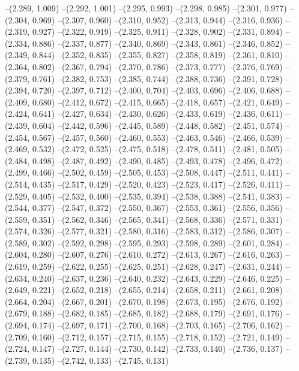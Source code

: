 {--(2.289, 1.009)
--(2.292, 1.001)
--(2.295, 0.993)
--(2.298, 0.985)
--(2.301, 0.977)
--(2.304, 0.969)
--(2.307, 0.960)
--(2.310, 0.952)
--(2.313, 0.944)
--(2.316, 0.936)
--(2.319, 0.927)
--(2.322, 0.919)
--(2.325, 0.911)
--(2.328, 0.902)
--(2.331, 0.894)
--(2.334, 0.886)
--(2.337, 0.877)
--(2.340, 0.869)
--(2.343, 0.861)
--(2.346, 0.852)
--(2.349, 0.844)
--(2.352, 0.835)
--(2.355, 0.827)
--(2.358, 0.819)
--(2.361, 0.810)
--(2.364, 0.802)
--(2.367, 0.794)
--(2.370, 0.786)
--(2.373, 0.777)
--(2.376, 0.769)
--(2.379, 0.761)
--(2.382, 0.753)
--(2.385, 0.744)
--(2.388, 0.736)
--(2.391, 0.728)
--(2.394, 0.720)
--(2.397, 0.712)
--(2.400, 0.704)
--(2.403, 0.696)
--(2.406, 0.688)
--(2.409, 0.680)
--(2.412, 0.672)
--(2.415, 0.665)
--(2.418, 0.657)
--(2.421, 0.649)
--(2.424, 0.641)
--(2.427, 0.634)
--(2.430, 0.626)
--(2.433, 0.619)
--(2.436, 0.611)
--(2.439, 0.604)
--(2.442, 0.596)
--(2.445, 0.589)
--(2.448, 0.582)
--(2.451, 0.574)
--(2.454, 0.567)
--(2.457, 0.560)
--(2.460, 0.553)
--(2.463, 0.546)
--(2.466, 0.539)
--(2.469, 0.532)
--(2.472, 0.525)
--(2.475, 0.518)
--(2.478, 0.511)
--(2.481, 0.505)
--(2.484, 0.498)
--(2.487, 0.492)
--(2.490, 0.485)
--(2.493, 0.478)
--(2.496, 0.472)
--(2.499, 0.466)
--(2.502, 0.459)
--(2.505, 0.453)
--(2.508, 0.447)
--(2.511, 0.441)
--(2.514, 0.435)
--(2.517, 0.429)
--(2.520, 0.423)
--(2.523, 0.417)
--(2.526, 0.411)
--(2.529, 0.405)
--(2.532, 0.400)
--(2.535, 0.394)
--(2.538, 0.388)
--(2.541, 0.383)
--(2.544, 0.377)
--(2.547, 0.372)
--(2.550, 0.367)
--(2.553, 0.361)
--(2.556, 0.356)
--(2.559, 0.351)
--(2.562, 0.346)
--(2.565, 0.341)
--(2.568, 0.336)
--(2.571, 0.331)
--(2.574, 0.326)
--(2.577, 0.321)
--(2.580, 0.316)
--(2.583, 0.312)
--(2.586, 0.307)
--(2.589, 0.302)
--(2.592, 0.298)
--(2.595, 0.293)
--(2.598, 0.289)
--(2.601, 0.284)
--(2.604, 0.280)
--(2.607, 0.276)
--(2.610, 0.272)
--(2.613, 0.267)
--(2.616, 0.263)
--(2.619, 0.259)
--(2.622, 0.255)
--(2.625, 0.251)
--(2.628, 0.247)
--(2.631, 0.244)
--(2.634, 0.240)
--(2.637, 0.236)
--(2.640, 0.232)
--(2.643, 0.229)
--(2.646, 0.225)
--(2.649, 0.221)
--(2.652, 0.218)
--(2.655, 0.214)
--(2.658, 0.211)
--(2.661, 0.208)
--(2.664, 0.204)
--(2.667, 0.201)
--(2.670, 0.198)
--(2.673, 0.195)
--(2.676, 0.192)
--(2.679, 0.188)
--(2.682, 0.185)
--(2.685, 0.182)
--(2.688, 0.179)
--(2.691, 0.176)
--(2.694, 0.174)
--(2.697, 0.171)
--(2.700, 0.168)
--(2.703, 0.165)
--(2.706, 0.162)
--(2.709, 0.160)
--(2.712, 0.157)
--(2.715, 0.155)
--(2.718, 0.152)
--(2.721, 0.149)
--(2.724, 0.147)
--(2.727, 0.144)
--(2.730, 0.142)
--(2.733, 0.140)
--(2.736, 0.137)
--(2.739, 0.135)
--(2.742, 0.133)
--(2.745, 0.131)
}
